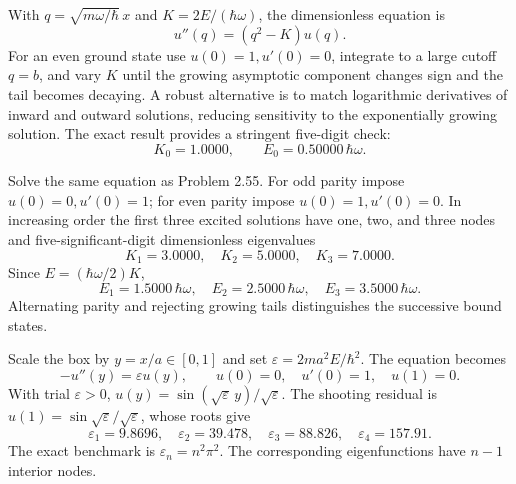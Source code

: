With $q=\sqrt{m\omega/\hbar}\,x$ and
$K=2E/(\hbar\omega)$, the dimensionless equation is
\begin{equation}
u''(q)=(q^2-K)u(q).
\end{equation}
For an even ground state use $u(0)=1,u'(0)=0$,
integrate to a large cutoff $q=b$, and vary $K$
until the growing asymptotic component changes sign
and the tail becomes decaying. A robust alternative
is to match logarithmic derivatives of inward and
outward solutions, reducing sensitivity to the
exponentially growing solution.
The exact result provides a stringent five-digit check:
\begin{equation}
\boxed{K_0=1.0000,\qquad
E_0=0.50000\,\hbar\omega}.
\end{equation}

Solve the same equation as Problem 2.55.
For odd parity impose $u(0)=0,u'(0)=1$;
for even parity impose $u(0)=1,u'(0)=0$.
In increasing order the first three excited
solutions have one, two, and three nodes and
five-significant-digit dimensionless eigenvalues
\begin{equation}
\boxed{K_1=3.0000,\quad K_2=5.0000,\quad K_3=7.0000}.
\end{equation}
Since $E=(\hbar\omega/2)K$,
\begin{equation}
\boxed{E_1=1.5000\,\hbar\omega,\quad
E_2=2.5000\,\hbar\omega,\quad
E_3=3.5000\,\hbar\omega}.
\end{equation}
Alternating parity and rejecting growing tails
distinguishes the successive bound states.

Scale the box by $y=x/a\in[0,1]$ and set
$\varepsilon=2ma^2E/\hbar^2$. The equation becomes
\begin{equation}
-u''(y)=\varepsilon u(y),\qquad
u(0)=0,\quad u'(0)=1,\quad u(1)=0.
\end{equation}
With trial $\varepsilon>0$,
$u(y)=\sin(\sqrt{\varepsilon}\,y)/\sqrt\varepsilon$.
The shooting residual is
$u(1)=\sin\sqrt{\varepsilon}/\sqrt\varepsilon$,
whose roots give
\begin{equation}
\boxed{\varepsilon_1=9.8696,\quad
\varepsilon_2=39.478,\quad
\varepsilon_3=88.826,\quad
\varepsilon_4=157.91}.
\end{equation}
The exact benchmark is $\varepsilon_n=n^2\pi^2$.
The corresponding eigenfunctions have $n-1$
interior nodes.

